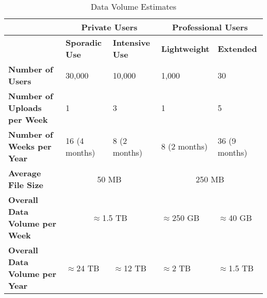 \begin{center}
    \begin{table}[h]
        \centering
        \begin{tabular}{| p{4cm} | p{2cm} | p{2cm} | p{2cm} | p{2cm} |}
            \hline
            \textbf{} & \multicolumn{2}{c|}{\textbf{Private Users}} & \multicolumn{2}{c|}{\textbf{Professional Users}} \\
            \hline
            \textbf{} & \textbf{Sporadic Use} & \textbf{Intensive Use} & \textbf{Lightweight} & \textbf{Extended} \\
            \hline
            \textbf{Number of Users} & 30,000 & 10,000 & 1,000 & 30 \\
            \hline
            \textbf{Number of Uploads per Week} & 1 & 3 & 1 & 5 \\
            \hline
            \textbf{Number of Weeks per Year} & 16 \newline (4 months) & 8 \newline (2 months) & 8 \newline (2 months) & 36 \newline (9 months) \\
            \hline
            \textbf{Average File Size} & \multicolumn{2}{c|}{50 MB} & \multicolumn{2}{c|}{250 MB} \\
            \hline
            \textbf{Overall Data Volume per Week} & \multicolumn{2}{c|}{$\approx$1.5 TB} & $\approx$250 GB & $\approx$40 GB \\
            \hline
            \textbf{Overall Data Volume per Year} & $\approx$24 TB & $\approx$12 TB & $\approx$2 TB & $\approx$1.5 TB \\
            \hline
        \end{tabular}
        \caption{Data Volume Estimates}
        \label{table:data_volume}
    \end{table}
    
    
\end{center}

